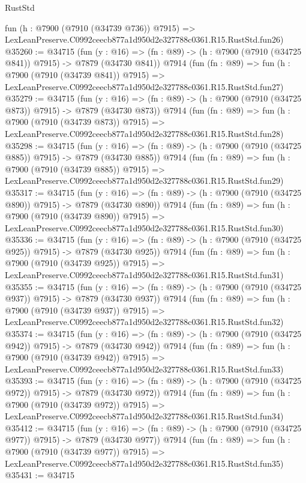 \begin{lexlean}{RustStd}
\begin{coremodule}
    fun (h : @7900 (@7910 (@34739 @736)) @7915) =>
    LexLeanPreserve.C0992ceecb877a1d950d2e327788c0361.R15.RustStd.fun26)
@35260 := @34715
    (fun (y : @16) => (fn : @89) -> (h : @7900 (@7910 (@34725 @841)) @7915) -> @7879 (@34730 @841))
    @7914
    (fun (fn : @89) =>
    fun (h : @7900 (@7910 (@34739 @841)) @7915) =>
    LexLeanPreserve.C0992ceecb877a1d950d2e327788c0361.R15.RustStd.fun27)
@35279 := @34715
    (fun (y : @16) => (fn : @89) -> (h : @7900 (@7910 (@34725 @873)) @7915) -> @7879 (@34730 @873))
    @7914
    (fun (fn : @89) =>
    fun (h : @7900 (@7910 (@34739 @873)) @7915) =>
    LexLeanPreserve.C0992ceecb877a1d950d2e327788c0361.R15.RustStd.fun28)
@35298 := @34715
    (fun (y : @16) => (fn : @89) -> (h : @7900 (@7910 (@34725 @885)) @7915) -> @7879 (@34730 @885))
    @7914
    (fun (fn : @89) =>
    fun (h : @7900 (@7910 (@34739 @885)) @7915) =>
    LexLeanPreserve.C0992ceecb877a1d950d2e327788c0361.R15.RustStd.fun29)
@35317 := @34715
    (fun (y : @16) => (fn : @89) -> (h : @7900 (@7910 (@34725 @890)) @7915) -> @7879 (@34730 @890))
    @7914
    (fun (fn : @89) =>
    fun (h : @7900 (@7910 (@34739 @890)) @7915) =>
    LexLeanPreserve.C0992ceecb877a1d950d2e327788c0361.R15.RustStd.fun30)
@35336 := @34715
    (fun (y : @16) => (fn : @89) -> (h : @7900 (@7910 (@34725 @925)) @7915) -> @7879 (@34730 @925))
    @7914
    (fun (fn : @89) =>
    fun (h : @7900 (@7910 (@34739 @925)) @7915) =>
    LexLeanPreserve.C0992ceecb877a1d950d2e327788c0361.R15.RustStd.fun31)
@35355 := @34715
    (fun (y : @16) => (fn : @89) -> (h : @7900 (@7910 (@34725 @937)) @7915) -> @7879 (@34730 @937))
    @7914
    (fun (fn : @89) =>
    fun (h : @7900 (@7910 (@34739 @937)) @7915) =>
    LexLeanPreserve.C0992ceecb877a1d950d2e327788c0361.R15.RustStd.fun32)
@35374 := @34715
    (fun (y : @16) => (fn : @89) -> (h : @7900 (@7910 (@34725 @942)) @7915) -> @7879 (@34730 @942))
    @7914
    (fun (fn : @89) =>
    fun (h : @7900 (@7910 (@34739 @942)) @7915) =>
    LexLeanPreserve.C0992ceecb877a1d950d2e327788c0361.R15.RustStd.fun33)
@35393 := @34715
    (fun (y : @16) => (fn : @89) -> (h : @7900 (@7910 (@34725 @972)) @7915) -> @7879 (@34730 @972))
    @7914
    (fun (fn : @89) =>
    fun (h : @7900 (@7910 (@34739 @972)) @7915) =>
    LexLeanPreserve.C0992ceecb877a1d950d2e327788c0361.R15.RustStd.fun34)
@35412 := @34715
    (fun (y : @16) => (fn : @89) -> (h : @7900 (@7910 (@34725 @977)) @7915) -> @7879 (@34730 @977))
    @7914
    (fun (fn : @89) =>
    fun (h : @7900 (@7910 (@34739 @977)) @7915) =>
    LexLeanPreserve.C0992ceecb877a1d950d2e327788c0361.R15.RustStd.fun35)
@35431 := @34715

\end{coremodule}
\end{lexlean}
